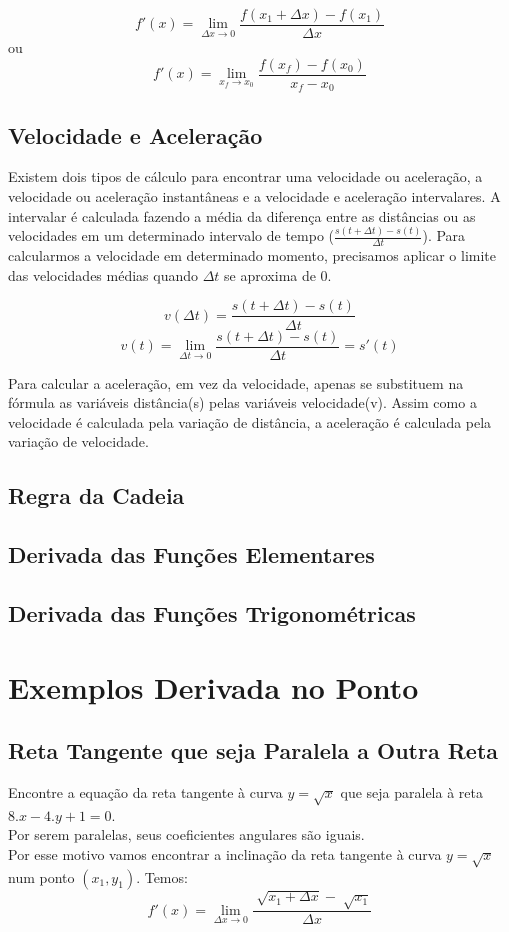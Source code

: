 \documentclass[ ]{article}
\begin{document}
		$$f'(x) = \lim_{\Delta x\to 0} \dfrac{f(x_1+\Delta x)-f(x_1)}{\Delta x}$$
		ou
		$$f'(x) = \lim_{x_f\to x_0}\dfrac{f(x_f)-f(x_0)}{x_f-x_0}$$	
		
	\subsection{Velocidade e Aceleração}
		Existem dois tipos de cálculo para encontrar uma velocidade ou aceleração, a velocidade ou aceleração instantâneas e a velocidade e aceleração intervalares. A intervalar é calculada fazendo a média da diferença entre as distâncias ou as velocidades em um determinado intervalo de tempo ($\frac{s(t+\Delta t)-s(t)}{\Delta t}$). Para calcularmos a velocidade em determinado momento, precisamos aplicar o limite das velocidades médias quando $\Delta t$ se aproxima de 0.
		
		$$v(\Delta t) = \frac{s(t+\Delta t)-s(t)}{\Delta t}$$
		$$v(t) =\lim_{\Delta t\to 0}\frac{s(t+\Delta t)-s(t)}{\Delta t}= s'(t)$$
		
		Para calcular a aceleração, em vez da velocidade, apenas se substituem na fórmula as variáveis distância(s) pelas variáveis velocidade(v). Assim como a velocidade é calculada pela variação de distância, a aceleração é calculada pela variação de velocidade.
		
	\subsection{Regra da Cadeia}
	\subsection{Derivada das Funções Elementares}
	\subsection{Derivada das Funções Trigonométricas}
	
\newpage
\section{Exemplos Derivada no Ponto}
	\subsection{Reta Tangente que seja Paralela a Outra Reta}	
		Encontre a equação da reta tangente à curva $y = \sqrt{x}$ que seja paralela à reta $8.x - 4.y + 1 = 0$.\\
		Por serem paralelas, seus coeficientes angulares são iguais.\\
		Por esse motivo vamos encontrar a inclinação da reta tangente à curva $y = \sqrt{x}$ num ponto $(x_1,y_1)$. Temos:
		$$f'(x) = \lim_{\Delta x\to 0}\dfrac{\sqrt[]{x_1 + \Delta x}-\sqrt[ ]{x_1}}{\Delta x}$$
\end{document}

